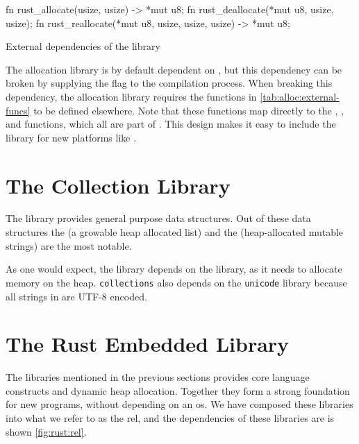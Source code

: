 \begin{listing}[H]
  \begin{rustcode}
fn rust_allocate(usize, usize) -> *mut u8;
fn rust_deallocate(*mut u8, usize, usize);
fn rust_reallocate(*mut u8, usize, usize, usize) -> *mut u8;
  \end{rustcode}
  \caption{External dependencies of the  library}
  \label{tab:alloc:external-funcs}
\end{listing}

The allocation library is by default dependent on , but this dependency can be broken by supplying the  flag to the compilation process.
When breaking this dependency, the allocation library requires the functions in \autoref{tab:alloc:external-funcs} to be defined elsewhere.
Note that these functions map directly to the , , and  functions, which all are part of {\newlib}.
This design makes it easy to include the {} library for new platforms like {\rg}.

\section{The Collection Library}

The {\rust}  library provides general purpose data structures.
Out of these data structures the  (a growable heap allocated list) and the  (heap-allocated mutable strings) are the most notable.

As one would expect, the  library depends on the  library, as it needs to allocate memory on the heap.
\texttt{collections} also depends on the \texttt{unicode} library because all strings in {\rust} are UTF-8 encoded.

\section{The Rust Embedded Library}
\label{sec:rel}

The libraries mentioned in the previous sections provides core language constructs and dynamic heap allocation.
Together they form a strong foundation for new {\rust} programs, without depending on an \gls{os}.
We have composed these libraries into what we refer to as the \gls{rel}, and the dependencies of these libraries are is shown \autoref{fig:rust:rel}.

